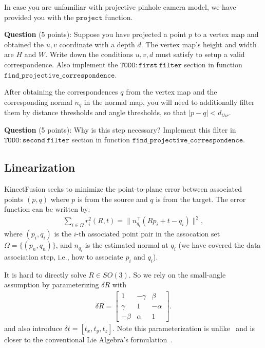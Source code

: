 \documentclass[12pt, a4paper]{article}
\begin{document}
In case you are unfamiliar with projective pinhole camera model, we have provided you with the $\mathtt{project}$ function.

\textbf{Question} (5 points): Suppose you have projected a point $p$ to a vertex map and obtained the $u, v$ coordinate with a depth $d$. The vertex map's height and width are $H$ and $W$. Write down the conditions $u, v, d$ must satisfy to setup a valid correspondence. Also implement the $\mathtt{TODO: first~filter}$ section in function $\mathtt{find\_projective\_correspondence}$.

After obtaining the correspondences $q$ from the vertex map and the corresponding normal $n_q$ in the normal map, you will need to additionally filter them by distance thresholds and angle thresholds, so that $|p - q| < d_{thr}$.

\textbf{Question} (5 points): Why is this step necessary? Implement this filter in $\mathtt{TODO: second~filter}$ section in function $\mathtt{find\_projective\_correspondence}$.

\subsection{Linearization}
KinectFusion seeks to minimize the point-to-plane error between associated points $(p, q)$ where $p$ is from the source and $q$ is from the target. The error function can be written by:
\begin{align}
	\sum_{i \in \Omega} r_i^2(R, t) = \bigg\lVert n_{q_i}^\top (Rp_i + t - q_i)\bigg\rVert^2,
\end{align}
where $(p_i, q_i)$ is the $i$-th associated point pair in the assocation set $\Omega = \{(p_n, q_n)\}$, and $n_{q_i}$ is the estimated normal at $q_i$ (we have covered the data association step, i.e., how to associate $p_i$ and $q_i$).

It is hard to directly solve $R \in SO(3)$. So we rely on the small-angle assumption by parameterizing $\delta R$ with
\begin{align}
	\delta R = \begin{bmatrix}
		1      & -\gamma & \beta   \\
		\gamma & 1       & -\alpha \\
		-\beta & \alpha  & 1
	\end{bmatrix}.
\end{align}
and also introduce $\delta t = [t_x, t_y, t_z]$.
Note this parameterization is unlike~\cite{icp} and is closer to the conventional Lie Algebra's formulation~\cite{sola2018micro}.
\end{document}
